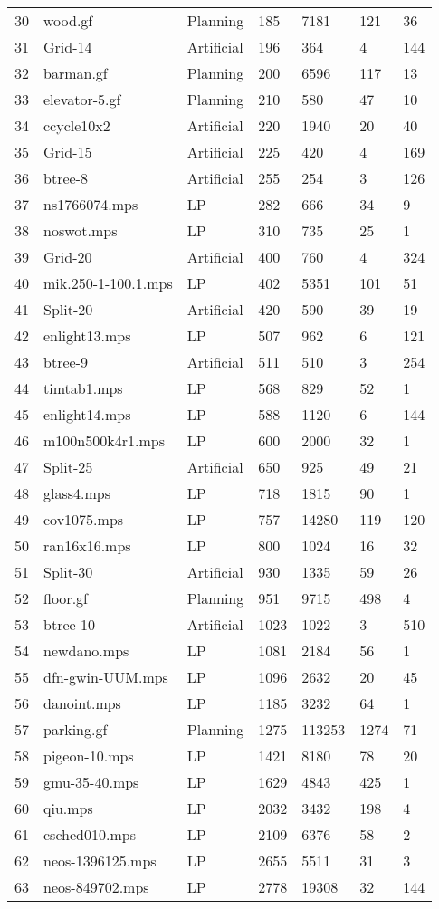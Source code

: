 \documentclass{article}
\begin{document}
\begin{longtable}{|l |l |l |l |l |l |l |}
30&wood.gf&Planning&185&7181&121&36\\
31&Grid-14&Artificial&196&364&4&144\\
32&barman.gf&Planning&200&6596&117&13\\
33&elevator-5.gf&Planning&210&580&47&10\\
34&ccycle10x2&Artificial&220&1940&20&40\\
35&Grid-15&Artificial&225&420&4&169\\
36&btree-8&Artificial&255&254&3&126\\
37&ns1766074.mps&LP&282&666&34&9\\
38&noswot.mps&LP&310&735&25&1\\
39&Grid-20&Artificial&400&760&4&324\\
40&mik.250-1-100.1.mps&LP&402&5351&101&51\\
41&Split-20&Artificial&420&590&39&19\\
42&enlight13.mps&LP&507&962&6&121\\
43&btree-9&Artificial&511&510&3&254\\
44&timtab1.mps&LP&568&829&52&1\\
45&enlight14.mps&LP&588&1120&6&144\\
46&m100n500k4r1.mps&LP&600&2000&32&1\\
47&Split-25&Artificial&650&925&49&21\\
48&glass4.mps&LP&718&1815&90&1\\
49&cov1075.mps&LP&757&14280&119&120\\
50&ran16x16.mps&LP&800&1024&16&32\\
51&Split-30&Artificial&930&1335&59&26\\
52&floor.gf&Planning&951&9715&498&4\\
53&btree-10&Artificial&1023&1022&3&510\\
54&newdano.mps&LP&1081&2184&56&1\\
55&dfn-gwin-UUM.mps&LP&1096&2632&20&45\\
56&danoint.mps&LP&1185&3232&64&1\\
57&parking.gf&Planning&1275&113253&1274&71\\
58&pigeon-10.mps&LP&1421&8180&78&20\\
59&gmu-35-40.mps&LP&1629&4843&425&1\\
60&qiu.mps&LP&2032&3432&198&4\\
61&csched010.mps&LP&2109&6376&58&2\\
62&neos-1396125.mps&LP&2655&5511&31&3\\
63&neos-849702.mps&LP&2778&19308&32&144\\

\end{longtable}
\end{document}
